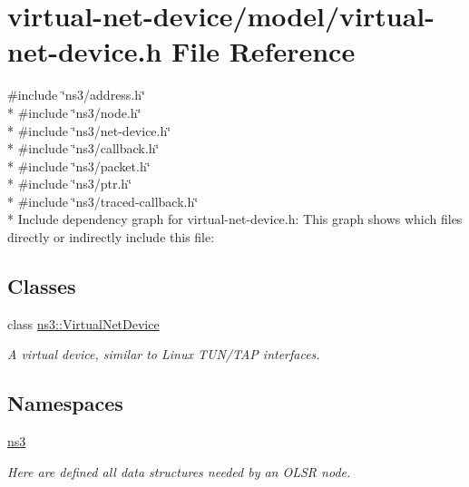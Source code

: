 \hypertarget{virtual-net-device_8h}{}\section{virtual-\/net-\/device/model/virtual-\/net-\/device.h File Reference}
\label{virtual-net-device_8h}
{\ttfamily \#include \char`\"{}ns3/address.\+h\char`\"{}}\\*
{\ttfamily \#include \char`\"{}ns3/node.\+h\char`\"{}}\\*
{\ttfamily \#include \char`\"{}ns3/net-\/device.\+h\char`\"{}}\\*
{\ttfamily \#include \char`\"{}ns3/callback.\+h\char`\"{}}\\*
{\ttfamily \#include \char`\"{}ns3/packet.\+h\char`\"{}}\\*
{\ttfamily \#include \char`\"{}ns3/ptr.\+h\char`\"{}}\\*
{\ttfamily \#include \char`\"{}ns3/traced-\/callback.\+h\char`\"{}}\\*
Include dependency graph for virtual-\/net-\/device.h\+:
This graph shows which files directly or indirectly include this file\+:
\subsection*{Classes}
\begin{DoxyCompactItemize}
\item 
class \hyperlink{classns3_1_1VirtualNetDevice}{ns3\+::\+Virtual\+Net\+Device}
\begin{DoxyCompactList}\small\item\em A virtual device, similar to Linux T\+U\+N/\+T\+AP interfaces. \end{DoxyCompactList}\end{DoxyCompactItemize}
\subsection*{Namespaces}
\begin{DoxyCompactItemize}
\item 
 \hyperlink{namespacens3}{ns3}
\begin{DoxyCompactList}\small\item\em Here are defined all data structures needed by an O\+L\+SR node. \end{DoxyCompactList}\end{DoxyCompactItemize}
